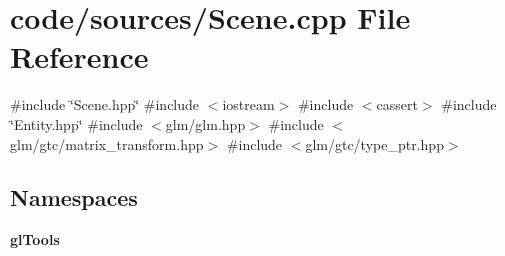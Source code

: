 \section{code/sources/\+Scene.cpp File Reference}
\label{_scene_8cpp}
{\ttfamily \#include \char`\"{}Scene.\+hpp\char`\"{}}\newline
{\ttfamily \#include $<$iostream$>$}\newline
{\ttfamily \#include $<$cassert$>$}\newline
{\ttfamily \#include \char`\"{}Entity.\+hpp\char`\"{}}\newline
{\ttfamily \#include $<$glm/glm.\+hpp$>$}\newline
{\ttfamily \#include $<$glm/gtc/matrix\+\_\+transform.\+hpp$>$}\newline
{\ttfamily \#include $<$glm/gtc/type\+\_\+ptr.\+hpp$>$}\newline
\subsection*{Namespaces}
\begin{DoxyCompactItemize}
\item 
 \textbf{ gl\+Tools}
\end{DoxyCompactItemize}
